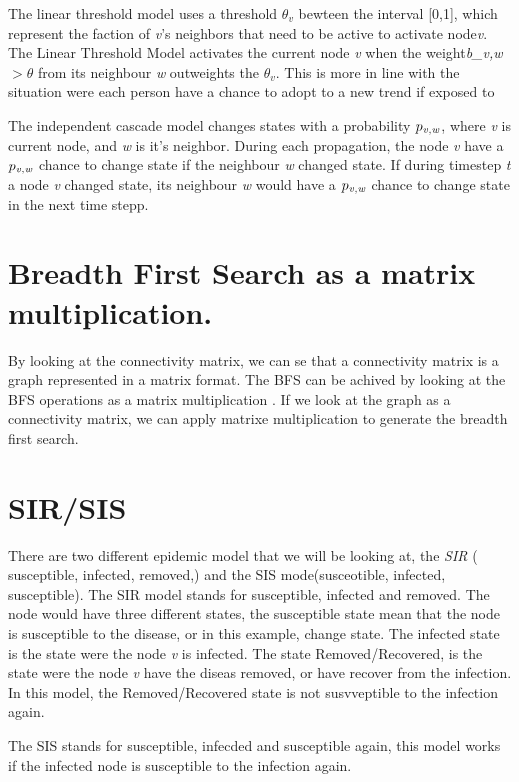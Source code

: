 The linear threshold model uses a threshold $\theta_v$ bewteen the interval [0,1], which represent the faction of {\it v}'s neighbors that need to be active to activate node{\it v}. The Linear Threshold Model activates the current node {\it v} when the weight{\it b_{v,w}} $> \theta$ from its neighbour {\it w} outweights the $\theta_v$. This is more in line with the situation were each person have a chance to adopt to a new trend if exposed to 

The independent cascade model changes states with a probability $p_{\it v, w}$, where {\it v }is current node, and {\it w} is it's neighbor. During each propagation, the node {\it v} have a  $p_{\it v, w}$ chance to change state if the neighbour {\it w} changed state. If during timestep {\it t} a node {\it v} changed state, its neighbour {\it w} would have a  $p_{\it v, w}$ chance to change state in the next time stepp. 

\section{Breadth First Search as a matrix multiplication.}
By looking at the 	connectivity matrix, we can se that a connectivity matrix is a graph represented in a matrix format. The BFS can be achived by looking at the BFS operations as a matrix multiplication \cite{algoToMath}. If we look at the graph as a connectivity matrix, we can apply matrixe multiplication to generate the breadth first search. 

\section{SIR/SIS}
There are two different epidemic model that we will be looking at, the {\it SIR} ( susceptible, infected, removed,) and the SIS mode(susceotible, infected, susceptible). The SIR model stands for susceptible, infected and removed. The node would have three different states, the susceptible state mean that the node is susceptible to the disease, or in this example, change state. The infected state is the state were the node {\it v} is infected. The state Removed/Recovered, is the state were the node {\it v} have the diseas removed, or have recover from the infection. In this model, the Removed/Recovered state is not susvveptible to the infection again. 

The SIS stands for susceptible, infecded and susceptible again, this model works if the infected node is susceptible to the infection again. 